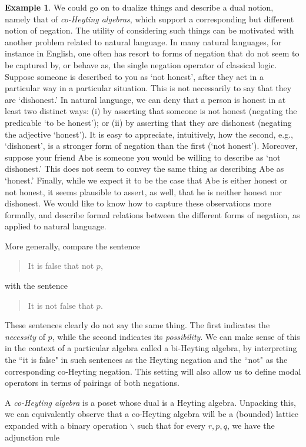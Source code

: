 \documentclass[a4paper]{book}
\theoremstyle{definition}
\newtheorem{example}{Example}[section]
\theoremstyle{definition}
\theoremstyle{definition}
\theoremstyle{theorem}
\theoremstyle{definition}
\begin{document}
\begin{example}
	We could go on to dualize things and describe a dual notion, namely that of \textit{co-Heyting algebras}, which support a corresponding but different notion of negation. The utility of considering such things can be motivated with another problem related to natural language. In many natural languages, for instance in English, one often has resort to forms of negation that do not seem to be captured by, or behave as, the single negation operator of classical logic. Suppose someone is described to you as `not honest', after they act in a particular way in a particular situation. This is not necessarily to say that they are `dishonest.' In natural language, we can deny that a person is honest in at least two distinct ways: (i) by asserting that someone is not honest (negating the predicable `to be honest'); or (ii) by asserting that they are dishonest (negating the adjective `honest'). It is easy to appreciate, intuitively, how the second, e.g., `dishonest', is a stronger form of negation than the first (`not honest'). Moreover, suppose your friend Abe is someone you would be willing to describe as `not dishonest.' This does not seem to convey the same thing as describing Abe as `honest.' Finally, while we expect it to be the case that Abe is either honest or not honest, it seems plausible to assert, as well, that he is neither honest nor dishonest.  We would like to know how to capture these observations more formally, and describe formal relations between the different forms of negation, as applied to natural language. \par
	More generally, compare the sentence
	\begin{quote}
		It is false that not $p$,
	\end{quote}  
	with the sentence 
	\begin{quote}
		It is not false that $p$. 
	\end{quote}
	These sentences clearly do not say the same thing. The first indicates the \textit{necessity} of $p$, while the second indicates its \textit{possibility}. We can make sense of this in the context of a particular algebra called a bi-Heyting algebra, by interpreting the ``it is false" in such sentences as the Heyting negation and the ``not" as the corresponding co-Heyting negation. This setting will also allow us to define modal operators in terms of pairings of both negations. \par 
	A \textit{co-Heyting algebra} is a poset whose dual is a Heyting algebra. Unpacking this, we can equivalently observe that a co-Heyting algebra will be a (bounded) lattice expanded with a binary operation $\smallsetminus$ such that for every $r, p, q$, we have the adjunction rule 

\end{example}
\end{document}
